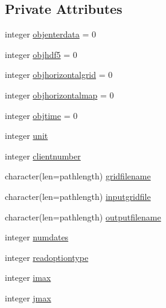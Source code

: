 \subsection*{Private Attributes}
\begin{DoxyCompactItemize}
\item 
integer \mbox{\hyperlink{structmodulemog2dformat_1_1t__mog2dformat_ac9a321e3d52f31c5fe8200481359dad2}{objenterdata}} = 0
\item 
integer \mbox{\hyperlink{structmodulemog2dformat_1_1t__mog2dformat_a28d0be15d202079dc8e2b59f813fefcb}{objhdf5}} = 0
\item 
integer \mbox{\hyperlink{structmodulemog2dformat_1_1t__mog2dformat_a07d8ba283015385216d6c33e1154e661}{objhorizontalgrid}} = 0
\item 
integer \mbox{\hyperlink{structmodulemog2dformat_1_1t__mog2dformat_afa41c23b651406dca9e9e12497d54e96}{objhorizontalmap}} = 0
\item 
integer \mbox{\hyperlink{structmodulemog2dformat_1_1t__mog2dformat_a1c249aba9627ee9bb44c0a0fcd4f9964}{objtime}} = 0
\item 
integer \mbox{\hyperlink{structmodulemog2dformat_1_1t__mog2dformat_a9c998b156db73ad51a928864b438ed39}{unit}}
\item 
integer \mbox{\hyperlink{structmodulemog2dformat_1_1t__mog2dformat_a0b0cc76086844205287095605ff48941}{clientnumber}}
\item 
character(len=pathlength) \mbox{\hyperlink{structmodulemog2dformat_1_1t__mog2dformat_a3213ab3659bf9f94bef7e8cdfc42a8ec}{gridfilename}}
\item 
character(len=pathlength) \mbox{\hyperlink{structmodulemog2dformat_1_1t__mog2dformat_a8dd15409f9aca06bd544129bca6083b5}{inputgridfile}}
\item 
character(len=pathlength) \mbox{\hyperlink{structmodulemog2dformat_1_1t__mog2dformat_a10d38465590e096410723825a2ccb6ca}{outputfilename}}
\item 
integer \mbox{\hyperlink{structmodulemog2dformat_1_1t__mog2dformat_abda060d8438fdaff9dae89df4dea1ce1}{numdates}}
\item 
integer \mbox{\hyperlink{structmodulemog2dformat_1_1t__mog2dformat_aa703212a57c1b84eb5b6278074d86e62}{readoptiontype}}
\item 
integer \mbox{\hyperlink{structmodulemog2dformat_1_1t__mog2dformat_a1d2accf6ef59aade2ea1a134bbe69de3}{imax}}
\item 
integer \mbox{\hyperlink{structmodulemog2dformat_1_1t__mog2dformat_a2317272e9023161c3a88bf131ac545d8}{jmax}}

\end{DoxyCompactItemize}
